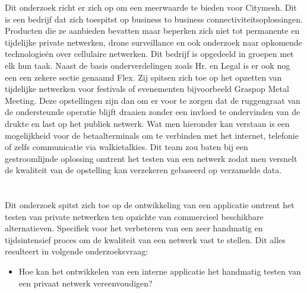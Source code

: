 Dit onderzoek richt er zich op om een meerwaarde te bieden voor Citymesh. Dit is een bedrijf dat zich toespitst op business to business connectiviteitsoplossingen. Producten die ze aanbieden bevatten maar beperken zich niet tot permanente en tijdelijke private netwerken, drone surveillance en ook onderzoek naar opkomende technologieën over cellulaire netwerken. Dit bedrijf is opgedeeld in groepen met elk hun taak. Naast de basis onderverdelingen zoals Hr. en Legal is er ook nog een een zekere sectie genaamd Flex. Zij spitsen zich toe op het opzetten van tijdelijke netwerken voor festivals of evenementen bijvoorbeeld Graspop Metal Meeting. Deze opstellingen zijn dan om er voor te zorgen dat de ruggengraat van de ondersteunde operatie blijft draaien zonder een invloed te ondervinden van de drukte en last op het publiek netwerk. Wat men hieronder kan verstaan is een mogelijkheid voor de betaalterminals om te verbinden met het internet, telefonie of zelfs communicatie via walkietalkies. Dit team zou baten bij een gestroomlijnde oplossing omtrent het testen van een netwerk zodat men versnelt de kwaliteit van de opstelling kan verzekeren gebaseerd op verzamelde data.

\section{}%
\label{sec:onderzoeksvraag}


Dit onderzoek spitst zich toe op de ontwikkeling van een applicatie omtrent het testen van private netwerken ten opzichte van commercieel beschikbare alternatieven. Specifiek voor het verbeteren van een zeer handmatig en tijdsintensief proces om de kwaliteit van een netwerk vast te stellen. Dit alles resulteert in volgende onderzoeksvraag:
\begin{itemize}
    \item Hoe kan het ontwikkelen van een interne applicatie het handmatig testen van een privaat netwerk vereenvoudigen?
\end{itemize}



